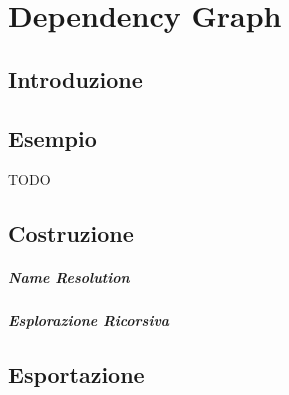 \chapter{Dependency Graph}

\section{Introduzione}

\section{Esempio}
TODO

\section{Costruzione}

\paragraph{Name Resolution}

\paragraph{Esplorazione Ricorsiva}

\section{Esportazione}
